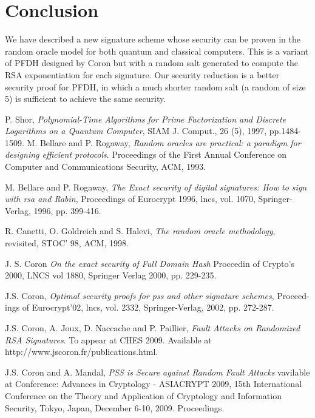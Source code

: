 \documentclass[a4paper,11pt]{article}
\begin{document}
\section{Conclusion}
We have described a new signature scheme whose security can be proven in the random oracle model for both quantum and classical computers. This is a variant of PFDH designed by Coron but with a random salt generated to compute the RSA exponentiation for each signature. Our security reduction is a better security proof for PFDH, in which a much shorter random salt (a random of size 5) is sufficient to achieve the same security. 

\begin{thebibliography}{10}
 P. Shor,
\emph{ Polynomial-Time Algorithms for Prime Factorization and Discrete Logarithms on a Quantum Computer},  SIAM J. Comput., 26 (5), 1997, pp.1484-1509.  
 M. Bellare and P. Rogaway, \emph{Random oracles are practical: a paradigm for designing
efficient protocols}. Proceedings of the First Annual Conference on Computer and Communications Security, ACM, 1993.

 M. Bellare and P. Rogaway, \emph{The Exact security of digital signatures: How to sign
with rsa and Rabin}, Proceedings of Eurocrypt 1996, lncs, vol. 1070, Springer-Verlag, 1996, pp. 399-416.

 R. Canetti, O. Goldreich and S. Halevi, \emph{The random oracle methodology}, revisited,
STOC' 98, ACM, 1998.

 J. S. Coron \emph{On the exact security of Full Domain Hash} Proccedin of Crypto's 2000, LNCS vol 1880,  Springer Verlag 2000, pp. 229-235.

 J.S. Coron,\emph{ Optimal security proofs for pss and other signature schemes}, Proceed-
ings of Eurocrypt'02, lncs, vol. 2332, Springer-Verlag, 2002, pp. 272-287.

 J.S. Coron, A. Joux, D. Naccache and P. Paillier, \emph{Fault Attacks on Randomized RSA Signatures}. To appear at CHES 2009. Available at http://www.jscoron.fr/publications.html.

 J.S. Coron and A. Mandal, \emph{PSS is Secure against Random Fault Attacks} vavilable at Conference: Advances in Cryptology - ASIACRYPT 2009, 15th International Conference on the Theory and Application of Cryptology and Information Security, Tokyo, Japan, December 6-10, 2009. Proceedings.


\end{thebibliography}
\end{document}
